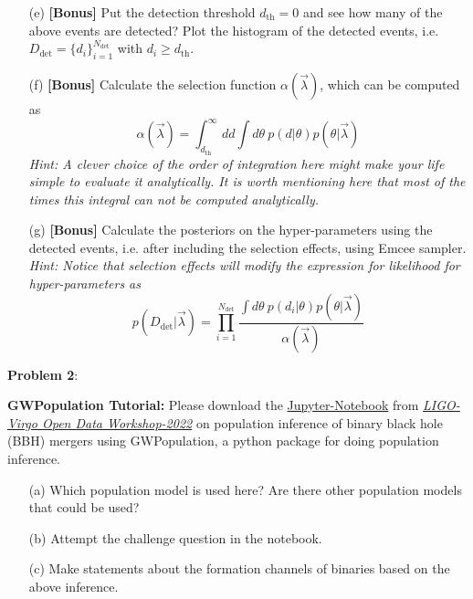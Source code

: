 \documentclass{article} %
\newcommand{\question}[2][]{\begin{flushleft}
        \textbf{Problem #1}: %
\end{flushleft}
}
\begin{document}
\begin{enumerate}
    \item[(e)] \textbf{[Bonus]} Put the detection threshold $d_\mathrm{th} = 0$ and see how many of the above events are detected? Plot the histogram of the detected events, i.e. $D_{\mathrm{det}} = \{ d_i\}_{i=1}^{N_{\mathrm{det}}}$ with $d_i \geq d_{\mathrm{th}}$.
    
    \item[(f)] \textbf{[Bonus]} Calculate the selection function $\alpha(\Vec{\lambda})$, which can be computed as
    \begin{equation}
        \alpha(\Vec{\lambda}) = \int_{d_{\mathrm{th}}}^\infty d d \int d\theta \ p(d|\theta) p(\theta|\Vec{\lambda})
    \end{equation}
    \textit{Hint: A clever choice of the order of integration here might make your life simple to evaluate it analytically. It is worth mentioning here that most of the times this integral can not be computed analytically.}
    
    \item[(g)] \textbf{[Bonus]} Calculate the posteriors on the hyper-parameters using the detected events, i.e. after including the selection effects, using Emcee sampler. \textit{Hint: Notice that selection effects will modify the expression for likelihood for hyper-parameters as}
    \begin{equation}
        p(D_{\mathrm{det}}|\Vec{\lambda}) =  \prod_{i=1}^{N_{\mathrm{det}}} \frac{\int d \theta \ p(d_i|\theta) p(\theta|\Vec{\lambda})}{\alpha(\Vec{\lambda})}
    \end{equation}

    \end{enumerate}

    \question[2]{} \textbf{GWPopulation Tutorial:} Please download the \href{https://github.com/gw-odw/odw-2022/blob/main/Tutorials/Advanced_topics/Tuto_A.2_Population_Inference_with_GWPopulation.ipynb}{Jupyter-Notebook} from \href{https://www.gw-openscience.org/odw/odw2022/}{\textit{LIGO-Virgo Open Data Workshop-2022}} on population inference of binary black hole (BBH) mergers using GWPopulation, a python package for doing population inference.
    \begin{enumerate}
        \item[(a)] Which population model is used here? Are there other population models that could be used?
        \item[(b)] Attempt the challenge question in the notebook.
	    \item[(c)] Make statements about the formation channels of binaries based on the above inference.
    \end{enumerate}
    
\end{document}
